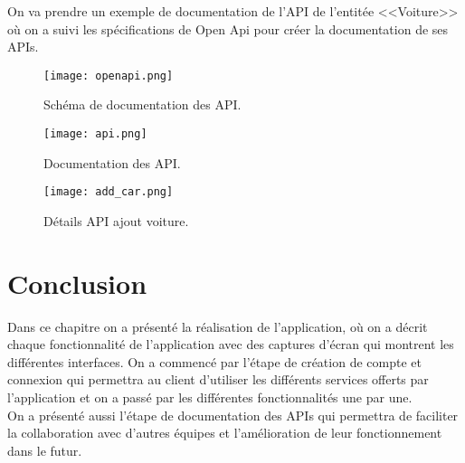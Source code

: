 On va prendre un exemple de documentation de l'API de l'entitée <<Voiture>> où on a suivi les spécifications de Open Api pour créer la documentation de ses APIs.
\begin{figure}[H]
    \centering
    \texttt{[image: openapi.png]}
    \captionsetup{justification=centering}
    \caption{Schéma de documentation des API.}
    \label{fig:api_doc_schema}
\end{figure}
\newpage
\begin{figure}[H]
    \centering
    \texttt{[image: api.png]}
    \captionsetup{justification=centering}
    \caption{Documentation des API.}
    \label{fig:api_doc}
\end{figure}
\begin{figure}[H]
    \centering
    \texttt{[image: add\_car.png]}
    \captionsetup{justification=centering}
    \caption{Détails API ajout voiture.}
    \label{fig:api_doc_detail}
\end{figure}
\clearpage
\section{Conclusion}
Dans ce chapitre on a présenté la réalisation de l'application, où on a décrit chaque fonctionnalité de l'application avec des captures d'écran qui montrent les différentes interfaces. On a commencé par l'étape de création de compte et connexion qui permettra au client d'utiliser les différents services offerts par l'application et on a passé par les différentes fonctionnalités une par une.\\
\noindent On a présenté aussi l'étape de documentation des APIs qui permettra de faciliter la collaboration avec d'autres équipes et l'amélioration de leur fonctionnement dans le futur.